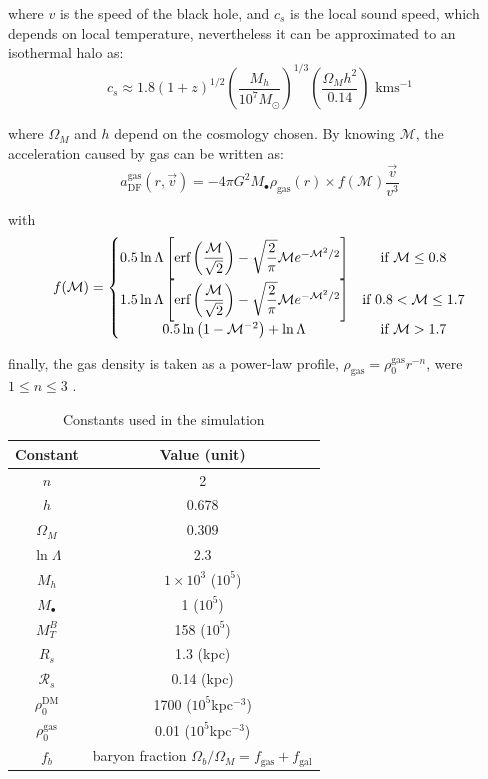 		 where $v$ is the speed of the black hole, and $c_s$ is the local sound speed, which depends on local temperature, nevertheless it can be approximated to an isothermal halo as:
		 \begin{equation}
		 	c_s \approx 1.8(1 + z)^{1/2}\left(\dfrac{M_h}{10^7M_\odot}\right)^{1/3}\left(\dfrac{\Omega_M h^2}{0.14}\right)\text{ kms$^{-1}$}
		 \end{equation}
		 
		 where $\Omega_M$ and $h$ depend on the cosmology chosen. By knowing $\mathcal{M}$, the acceleration caused by gas can be written as:
		 \begin{equation}
		 	a^\text{gas}_\text{DF}(r, \vec{v}) = -4\pi G^2M_\bullet\rho_\text{gas}(r)\times f(\mathcal{M})\dfrac{\vec{v}}{v^3}
		 \end{equation}
		 
		 with
		 \begin{equation}
		 	f(\mathcal{M}) = \left\{
			\begin{matrix}
			0.5\ln\Lambda \left[\text{erf}\left(\dfrac{\mathcal{M}}{\sqrt{2}}\right) - \sqrt{\dfrac{2}{\pi}}\mathcal{M}e^{-\mathcal{M}^2/2}\right]& \text{if $\mathcal{M} \leq 0.8$}\\
			1.5\ln\Lambda \left[\text{erf}\left(\dfrac{\mathcal{M}}{\sqrt{2}}\right) - \sqrt{\dfrac{2}{\pi}}\mathcal{M}e^{-\mathcal{M}^2/2}\right] & \text{if $0.8 < \mathcal{M} \leq 1.7$}\\
			0.5\ln\left(1 - \mathcal{M}^{-2}\right) + \ln\Lambda & \text{if $\mathcal{M} > 1.7$}
			\end{matrix}
			\right.
		 \end{equation}
		 
		 finally, the gas density is taken as a power-law profile, $\rho_\text{gas}=\rho_0^\text{gas}r^{-n}$, were $1 \leq n \leq 3$ \cite{choksi2017recoiling}.
	
		\begin{table}[h]
			\centering
			\caption{Constants used in the simulation}
			\begin{tabular}{c|c}
				\hline
				\textbf{Constant} & \textbf{Value (unit)} \\
				\hline
				$n$ & 2\\
				$h$ & 0.678 \\
				$\Omega_M$ & 0.309 \\
				$\ln\Lambda$ & 2.3 \\
				$M_h$ & $1\times10^3$ ($10^5$\sm) \\
				$M_\bullet$ & 1 ($10^5$\sm) \\
				$M_T^B$ & 158 ($10^5$\sm) \\
				$R_s$ & 1.3 (kpc) \\
				$\mathcal{R}_s$ & 0.14 (kpc) \\
				$\rho_0^\text{DM}$ & 1700 ($10^5$\sm kpc$^{-3}$)\\
				$\rho_0^\text{gas}$ & 0.01 ($10^5$\sm kpc$^{-3}$)\\
				$f_b$ & baryon fraction $\Omega_b / \Omega_M = f_\text{gas} + f_\text{gal}$ \\
				\hline
			\end{tabular}
		\end{table}
	
